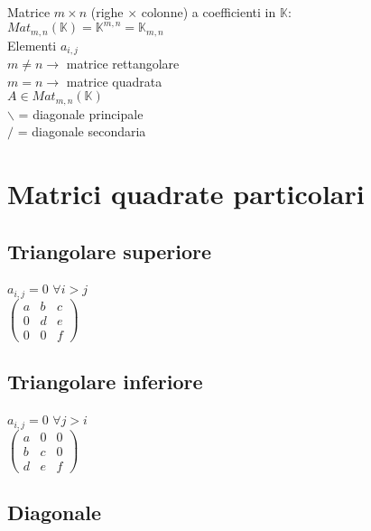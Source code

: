 \documentclass[a4paper, twoside, italian, 11pt]{book}
\newcommand{\K}{\mathbb{K}}
\begin{document}
Matrice $m \times n$ (righe $\times$ colonne) a coefficienti in $\K$: \\
$Mat_{m,n}(\K) = \K^{m,n} = \K_{m,n}$ \\

\noindent
Elementi $a_{i, j}$ \\

\noindent
$m \neq n \rightarrow$ matrice rettangolare \\
$m = n \rightarrow$ matrice quadrata \\

\noindent
$A \in Mat_{m,n}(\K)$ \\

\noindent
$\backslash$ = diagonale principale \\
$/$ = diagonale secondaria \\



\section{Matrici quadrate particolari}


\subsection{Triangolare superiore}

$a_{i,j} = 0$ $\forall i > j$ \\

\noindent
$\begin{pmatrix}
a & b & c \\
0 & d & e \\
0 & 0 & f
\end{pmatrix}$


\subsection{Triangolare inferiore}

$a_{i,j} = 0$ $\forall j > i$ \\

\noindent
$\begin{pmatrix}
a & 0 & 0 \\
b & c & 0 \\
d & e & f
\end{pmatrix}$


\subsection{Diagonale}
\end{document}
